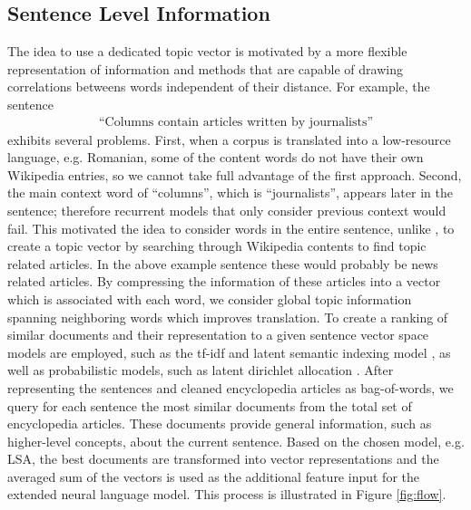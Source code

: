 \documentclass[a4paper]{article}
\begin{document}
\subsection{Sentence Level Information} \label{sec:sentence-level}
The idea to use a dedicated topic vector is motivated by a more flexible representation of information and methods that are capable of drawing correlations betweens words independent of their distance.
For example, the sentence 
\begin{align}
\text{``Columns contain articles written by journalists''}
\end{align}
exhibits several problems. First, when a corpus is translated into a low-resource language, e.g. Romanian, some of the content words do not have their own Wikipedia entries, so we cannot take full advantage of the first approach. Second, the main context word of ``columns'', which is ``journalists'', appears later in the sentence; therefore recurrent models that only consider previous context would fail. 
This motivated the idea to consider words in the entire sentence, unlike \cite{mikolov2012context}, to create a topic vector by searching through Wikipedia contents to find topic related articles. In the above example sentence these would probably be news related articles. By compressing the information of these articles into a vector which is associated with each word, we consider global topic information spanning neighboring words which improves translation. 
To create a ranking of similar documents and their representation to a given sentence vector space models are employed, such as the tf-idf \cite{salton1986introduction} and latent semantic indexing model \cite{bradford2008empirical}, as well as probabilistic models, such as latent dirichlet allocation \cite{blei2003latent}. After representing the sentences and cleaned encyclopedia articles as bag-of-words, we query for each sentence the most similar documents from the total set of encyclopedia articles. These documents provide general information, such as higher-level concepts, about the current sentence. Based on the chosen model, e.g. LSA, the best documents are transformed into vector representations and the averaged sum of the vectors is used as the additional feature input for the extended neural language model. This process is illustrated in Figure \ref{fig:flow}.
\end{document}
